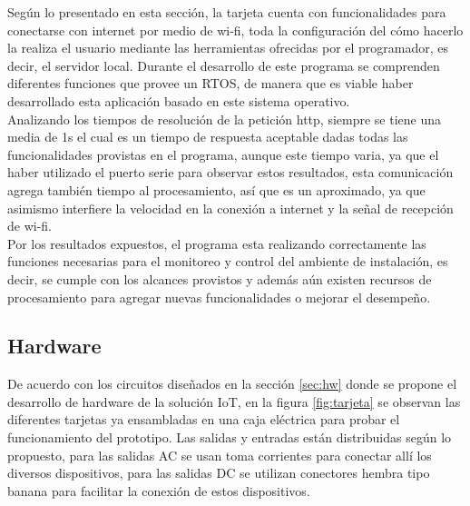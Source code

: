 
Según lo presentado en esta sección, la tarjeta cuenta con funcionalidades para conectarse con internet por medio de wi-fi, toda la configuración del cómo hacerlo la realiza el usuario mediante las herramientas ofrecidas por el programador, es decir, el servidor local. Durante el desarrollo de este programa se comprenden diferentes funciones que provee un RTOS, de manera que es viable haber desarrollado esta aplicación basado en este sistema operativo.\\

Analizando los tiempos de resolución de la petición http, siempre se tiene una media de 1s el cual es un tiempo de respuesta aceptable dadas todas las funcionalidades provistas en el programa, aunque este tiempo varia, ya que el haber utilizado el puerto serie para observar estos resultados, esta comunicación agrega también tiempo al procesamiento, así que es un aproximado, ya que asimismo interfiere la velocidad en la conexión a internet y la señal de recepción de wi-fi.\\

Por los resultados expuestos, el programa esta realizando correctamente las funciones necesarias para el monitoreo y control del ambiente de instalación, es decir, se cumple con los alcances provistos y además aún existen recursos de procesamiento para agregar nuevas funcionalidades o mejorar el desempeño.

\subsection{Hardware}

De acuerdo con los circuitos diseñados en la sección \ref{sec:hw} donde se propone el desarrollo de hardware de la solución IoT, en la figura \ref{fig:tarjeta} se observan las diferentes tarjetas ya ensambladas en una caja eléctrica para probar el funcionamiento del prototipo. Las salidas y entradas están distribuidas según lo propuesto, para las salidas AC se usan toma corrientes para conectar allí los diversos dispositivos, para las salidas DC se utilizan conectores hembra tipo banana para facilitar la conexión de estos dispositivos.\\

